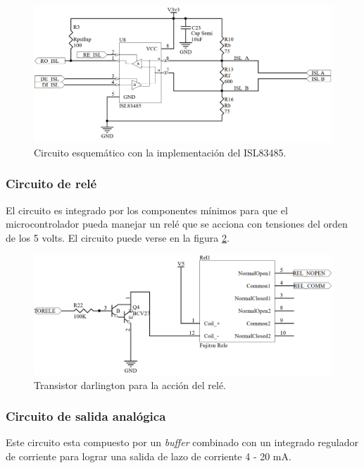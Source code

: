 \begin{figure}[!htb]
	\centering
	\includegraphics[width=120mm,keepaspectratio]{Figures/RSS485_1.png}
	\caption{Circuito esquemático con la implementación del ISL83485.}
	\label{fig:4851esquem}
\end{figure}


\subsubsection{Circuito de relé}
El circuito es integrado por los componentes mínimos para que el microcontrolador pueda manejar un relé que se acciona con tensiones del orden de los 5 volts. El circuito puede verse en la figura \ref{fig:rele1equem}.

\begin{figure}[!htb]
	\centering
	\includegraphics[width=120mm,keepaspectratio]{Figures/rele1.png}
	\caption{Transistor darlington para la acción del relé.}
	\label{fig:rele1equem}
\end{figure}

\subsubsection{Circuito de salida analógica}
Este circuito esta compuesto por un \textit{buffer} combinado con un integrado regulador de corriente para lograr una salida de lazo de corriente 4 - 20 mA.


